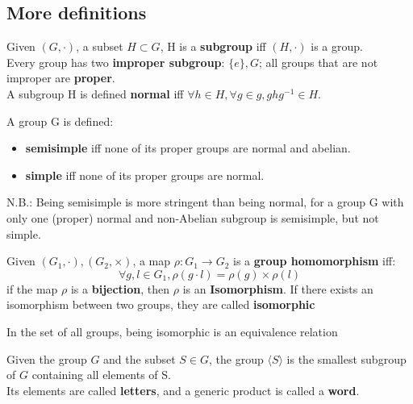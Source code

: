 \subsection{More definitions}
\begin{definition}
  Given $(G,\cdot)$, a subset $H \subset G$, H is a \textbf{subgroup} iff  $(H, \cdot)$ is a group. \\
  Every group has two \textbf{improper subgroup}: $\{e\}, G$; all groups that are not improper are \textbf{proper}. \\
  A subgroup H is defined \textbf{normal} iff $\forall h \in H, \forall g \in g, ghg^{-1} \in H$.

\end{definition}
  \begin{definition}
  A group G is defined:
  \begin{itemize}
    \item \textbf{semisimple} iff none of its proper groups are normal and abelian.
    \item \textbf{simple} iff none of its proper groups are normal.
  \end{itemize}
  N.B.: Being semisimple is more stringent than being normal, for a group G with only one (proper) normal and non-Abelian subgroup is semisimple, but not simple.
\end{definition}

\begin{definition}
  Given $(G_1, \cdot), (G_2, \times)$, a map $\rho : G_1 \to G_2 $ is a \textbf{group homomorphism} iff:
  \[
   \forall g, l\in G_1, \rho(g\cdot l) = \rho(g) \times \rho(l)
  \]
if the map $\rho$ is a \textbf{bijection}, then $\rho$ is an \textbf{Isomorphism}.
If there exists an isomorphism between two groups, they are called \textbf{isomorphic} 
\end{definition}
\begin{claim}
  In the set of all groups, being isomorphic is an equivalence relation
\end{claim}

\begin{definition}
  Given the group $G$ and the subset $S \in G$, the group $\langle S \rangle$ is the smallest subgroup of $G$ containing all elements of S.\\
  Its elements are called \textbf{letters}, and a generic product is called a \textbf{word}. \\
\end{definition}

